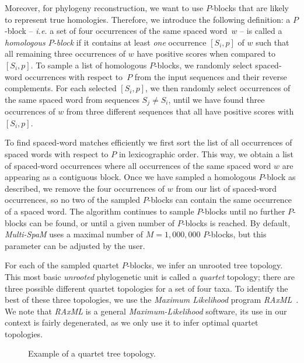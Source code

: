 \documentclass[review]{elsarticle}
\begin{document}
{Moreover, for phylogeny reconstruction, we want to use $P$-blocks that are likely to represent true homologies. Therefore, we introduce the following definition: a $P$-block -- {\em i.e.} a set of four occurrences of the same spaced word~$w$ --  is called a {\em homologous $P$-block} if it contains at least {\em one} occurrence $[S_i,p]$ of $w$  such that all remaining three occurrences of $w$  have positive scores when compared to $[S_i,p]$.  
%
To sample a list of homologous $P$-blocks, we randomly select spaced-word occurrences with respect to~$P$ from the input sequences and their reverse complements. For each selected $[S_i,p]$, we then randomly select occurrences of the same spaced word from sequences $S_j \not= S_i$, until we have found three occurrences of $w$ from three different sequences that all have positive scores with $[S_i,p]$.
%


%




To find spaced-word matches efficiently  we
first sort the list of all occurrences of spaced words with respect to $P$ in lexicographic order. This way, we obtain a list of spaced-word occurrences where all occurrences of the same spaced word $w$ are appearing as a contiguous block. 
Once we have sampled a homologous $P$-block as described, we remove the four occurrences of $w$ from our list of spaced-word occurrences, so no two of the sampled $P$-blocks can contain the same occurrence of a spaced word. 
%
The algorithm continues to sample $P$-blocks until no further $P$-blocks can be found, or until a given number 
of  $P$-blocks is reached. By default, {\em Multi-SpaM} uses a maximal number of $M=1,000,000$ $P$-blocks, but this parameter can be adjusted by the user.  


{For each of the sampled quartet $P$-blocks, we infer an unrooted tree topology. This most basic {\em unrooted} phylogenetic unit is called a \textit{quartet} topology; there are three possible different quartet
topologies for a set of four taxa.  
To identify the best of these three topologies, we use the {\em Maximum Likelihood} program {\em RAxML}~\cite{sta:14}.  We note that 
{\em RAxML} is a general {\em Maximum-Likelihood} software, its use in our context is fairly degenerated, as we only use it to 
infer optimal quartet topologies.}\\
%
\begin{figure}[h]
\centering
\label{fig:qrtt}
\caption{Example of a quartet tree topology.}
\end{figure}

}
\end{document}
